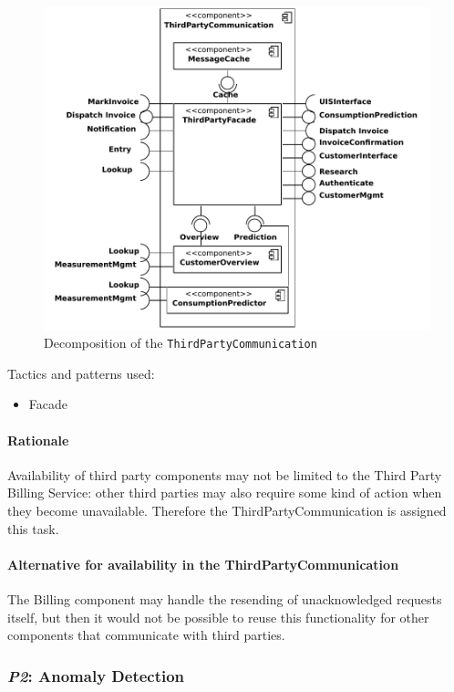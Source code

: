 \documentclass[a4paper,10pt]{article}
\begin{document}
\begin{figure}[!htp]
    \centering
    \includegraphics[width=\textwidth]{Decomposition_ Communication with third parties}
    \caption{Decomposition of the \texttt{ThirdPartyCommunication}}\label{fig:dec_thirdparty}
\end{figure}

\noindent Tactics and patterns used:
\begin{itemize}
	\item Facade
\end{itemize}

\paragraph{Rationale} Availability of third party components may not be limited to the Third Party Billing Service: other third parties may also require some kind of action when they become unavailable. Therefore the ThirdPartyCommunication is assigned this task.

\paragraph{Alternative for availability in the ThirdPartyCommunication}
The Billing component may handle the resending of unacknowledged requests itself, but then it would not be possible to reuse this functionality for other components that communicate with third parties.

\subsubsection{\emph{P2}: Anomaly Detection}
\end{document}
